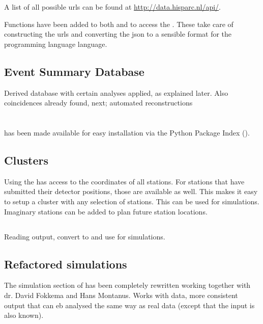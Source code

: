A list of all possible urls can be found at \url{http://data.hisparc.nl/api/}.

Functions have been added to both \sapphire and \jsparc to access the
\api. These take care of constructing the urls and converting the json to a
sensible format for the programming language language.


\subsection{Event Summary Database}

Derived database with certain analyses applied, as explained later. Also
coincidences already found, next; automated reconstructions


\section{\sapphire}


\subsection{\pypi}

\sapphire has been made available for easy installation via the Python
Package Index (\pypi).


\subsection{Clusters}

Using the \api \sapphire has access to the \gps coordinates of all
stations. For stations that have submitted their detector positions,
those are available as well. This makes it easy to setup a cluster with
any selection of \hisparc stations. This can be used for simulations.
Imaginary stations can be added to plan future station locations.

\subsection{\corsika}

Reading \corsika output, convert to \hdf and use for simulations.


\subsection{Refactored simulations}

The simulation section of \sapphire has been completely rewritten
working together with dr. David Fokkema and Hans Montanus. Works with
\corsika data, more consistent output that can eb analysed the same way
as real \hisparc data (except that the input is also known).


